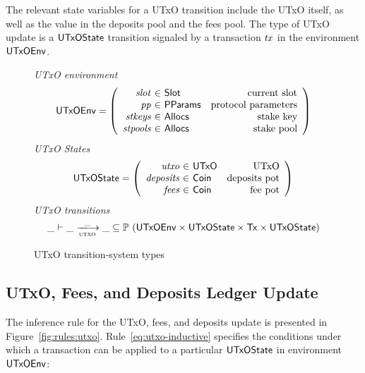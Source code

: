 \documentclass[11pt,a4paper,dvipsnames]{article}
\newcommand{\Tx}{\type{Tx}}
\newcommand{\UTxO}{\type{UTxO}}
\newcommand{\Coin}{\type{Coin}}
\newcommand{\PParams}{\type{PParams}}
\newcommand{\Slot}{\type{Slot}}
\newcommand{\Allocs}{\type{Allocs}}
\newcommand{\UTxOState}{\ensuremath{\type{UTxOState}}}
\newcommand{\UTxOEnv}{\type{UTxOEnv}}
\theoremstyle{definition}
\theoremstyle{definition}
\begin{document}
The relevant state variables for a UTxO transition include the UTxO itself,
as well as the value in the deposits pool and the fees pool.
The type of UTxO update is a $\UTxOState$ transition signaled by
a transaction $\mathit{tx}$ in the environment $\UTxOEnv$.


\begin{figure}
  \emph{UTxO environment}
  \begin{equation*}
    \UTxOEnv =
    \left(
      \begin{array}{r@{~\in~}lr}
        \var{slot} & \Slot & \text{current slot}\\
        \var{pp} & \PParams & \text{protocol parameters}\\
        \var{stkeys} & \Allocs & \text{stake key}\\
        \var{stpools} & \Allocs & \text{stake pool}\\
      \end{array}
    \right)
  \end{equation*}
  \emph{UTxO States}
  \begin{equation*}
    \UTxOState =
    \left(
      \begin{array}{r@{~\in~}lr}
        \var{utxo} & \UTxO & \text{UTxO}\\
        \var{deposits} & \Coin & \text{deposits pot}\\
        \var{fees} & \Coin & \text{fee pot}\\
      \end{array}
    \right)
  \end{equation*}
  \emph{UTxO transitions}
  \begin{equation*}
    \_ \vdash
    \var{\_} \trans{utxo}{\_} \var{\_}
    \subseteq \powerset (\UTxOEnv \times \UTxOState \times \Tx \times \UTxOState)
  \end{equation*}
  \caption{UTxO transition-system types}
  \label{fig:ts-types:utxo}
\end{figure}

\clearpage

\subsection{UTxO, Fees, and Deposits Ledger Update}
\label{sec:utxo-ufd}

The inference rule for the UTxO, fees, and deposits update is presented in
Figure~\ref{fig:rules:utxo}.
Rule~\ref{eq:utxo-inductive} specifies the conditions under which a transaction can
be applied to a particular $\UTxOState$ in environment $\UTxOEnv$:
\end{document}
